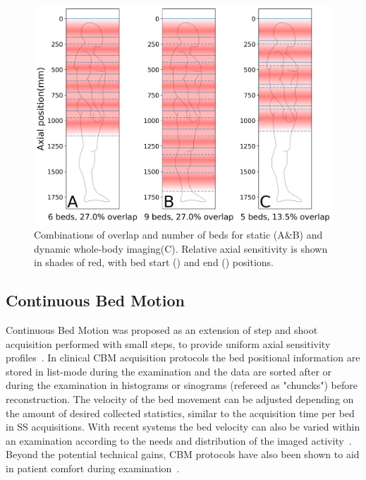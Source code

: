 %
%
\begin{figure} [ht!]
\centering
\includegraphics[scale=0.5,angle=0]{3_Results/3_1_DWB_Optimization/figures/SensitivityProfiles_overHuman.png}
\caption{Combinations of overlap and number of beds for static (A\&B) and dynamic whole-body imaging(C). Relative axial sensitivity is shown in shades of red, with bed start (\protect{}) and end (\protect{}) positions.} 
\label{fig3_1:BodyCoverage}
\end{figure}
%
%
%
\subsection{Continuous Bed Motion}
Continuous Bed Motion was proposed as an extension of step and shoot acquisition performed with small steps, to provide uniform axial sensitivity profiles~\cite{Dahlbom2001,Brasse2002}. In clinical CBM acquisition protocols the bed positional information are stored in list-mode during the examination and the data are sorted after or during the examination in histograms or sinograms (refereed as "chuncks") before reconstruction. The velocity of the bed movement can be adjusted depending on the amount of desired collected statistics, similar to the acquisition time per bed in SS acquisitions. With recent systems the bed velocity can also be varied within an examination according to the needs and distribution of the imaged activity~\cite{Panin2014}. Beyond the potential technical gains, CBM protocols have also been shown to aid in patient comfort during examination~\cite{Schatka2016}. 
%
